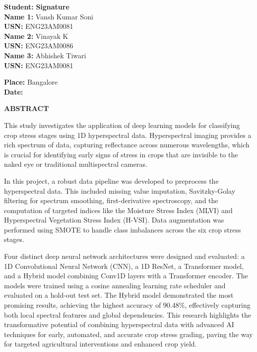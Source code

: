 \documentclass[ 12pt,a4paper,twocolumn,fleqn]{report}
\begin{document}
\noindent
\begin{minipage}{0.8\textwidth}
    \textbf{Student:} \hfill\textbf{Signature}\\
    
    \textbf{Name 1:} Vansh Kumar Soni \\ \textbf{USN:} ENG23AM0081 \\
    
    \textbf{Name 2:} Vinayak K \\ \textbf{USN:} ENG23AM0086 \\
    
    \textbf{Name 3:} Abhishek Tiwari \\ \textbf{USN:} ENG23AM0081 \\
\end{minipage}

\begin{flushleft}
    \textbf{Place:} Bangalore \\
    \textbf{Date:} 
\end{flushleft}


\newpage
  \pagestyle{fancy}

\begin{center}
    \huge\textbf{ABSTRACT}
\end{center}
\vspace{15mm}
This study investigates the application of deep learning models for classifying crop stress stages using 1D hyperspectral data. Hyperspectral imaging provides a rich spectrum of data, capturing reflectance across numerous wavelengths, which is crucial for identifying early signs of stress in crops that are invisible to the naked eye or traditional multispectral cameras.

In this project, a robust data pipeline was developed to preprocess the hyperspectral data. This included missing value imputation, Savitzky-Golay filtering for spectrum smoothing, first-derivative spectroscopy, and the computation of targeted indices like the Moisture Stress Index (MLVI) and Hyperspectral Vegetation Stress Index (H-VSI). Data augmentation was performed using SMOTE to handle class imbalances across the six crop stress stages.

Four distinct deep neural network architectures were designed and evaluated: a 1D Convolutional Neural Network (CNN), a 1D ResNet, a Transformer model, and a Hybrid model combining Conv1D layers with a Transformer encoder. The models were trained using a cosine annealing learning rate scheduler and evaluated on a hold-out test set. The Hybrid model demonstrated the most promising results, achieving the highest accuracy of 90.48\%, effectively capturing both local spectral features and global dependencies. This research highlights the transformative potential of combining hyperspectral data with advanced AI techniques for early, automated, and accurate crop stress grading, paving the way for targeted agricultural interventions and enhanced crop yield.
\end{document}
